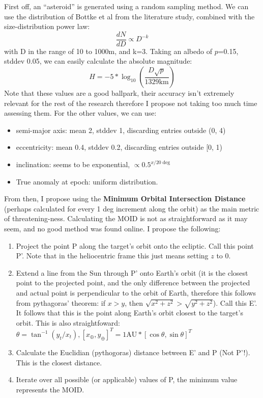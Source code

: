 \documentclass[a4paper,10pt]{article}
\begin{document}
First off, an ``asteroid'' is generated using a random sampling method. We can use the distribution of Bottke et al from the literature study, combined with the size-distribution power law:
\begin{equation}
 \frac{dN}{dD} \propto D^{-k}
\end{equation}
with D in the range of 10 to 1000m, and k=3. Taking an albedo of $p$=0.15, stddev 0.05, we can easily calculate the absolute magnitude:
\begin{equation}
 H = -5 * \log _{10} \left(\frac{D\sqrt{p}}{1329\mathrm{km}}\right)
\end{equation}
Note that these values are a good ballpark, their accuracy isn't extremely relevant for the rest of the research therefore I propose not taking too much time assessing them. For the other values, we can use:
\begin{itemize}
 \item semi-major axis: mean 2, stddev 1, discarding entries outside (0, 4)
 \item eccentricity: mean 0.4, stddev 0.2, discarding entries outside [0, 1)
 \item inclination: seems to be exponential, $\propto 0.5^{x/20\deg}$
 \item True anomaly at epoch: uniform distribution.

\end{itemize}
From then, I propose using the \textbf{Minimum Orbital Intersection Distance} (perhaps calculated for every 1 deg increment along the orbit) as the main metric of threatening-ness. Calculating the MOID is not as straightforward as it may seem, and no good method was found online. I propose the following:
\begin{enumerate}
 \item Project the point P along the target's orbit onto the ecliptic. Call this point P'. Note that in the heliocentric frame this just means setting $z$ to 0.
 \item Extend a line from the Sun through P' onto Earth's orbit (it is the closest point to the projected point, and the only difference between the projected and actual point is perpendicular to the orbit of Earth, therefore this follows from pythagoras' theorem: if $x > y$, then $\sqrt{x^2 + z^2} > \sqrt{y^2 + z^2}$). Call this E'. It follows that this is the point along Earth's orbit closest to the target's orbit. This is also straightfoward: $\theta = \tan^{-1}(y_t/x_t), [x_\oplus, y_\oplus]^T = 1\mathrm{AU} * [\cos \theta, \sin \theta ]^T$
 \item Calculate the Euclidian (pythogoras) distance between E' and P (Not P'!). This is the closest distance.
 \item Iterate over all possible (or applicable) values of P, the minimum value represents the MOID.
\end{enumerate}
\end{document}
